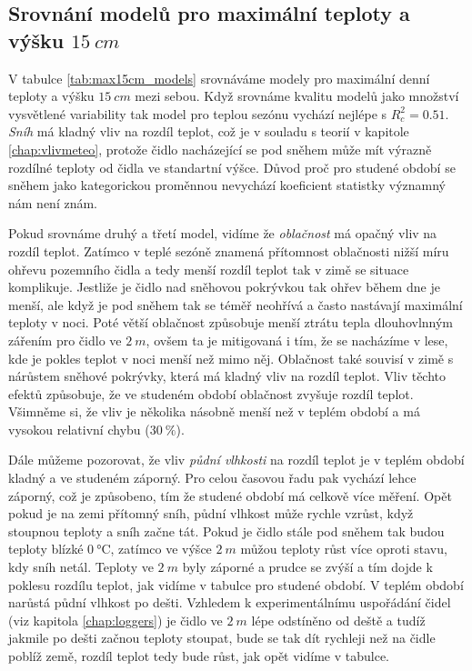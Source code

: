 \subsection{Srovnání modelů pro maximální teploty a výšku $\SI{15}{cm}$}
V tabulce \ref{tab:max15cm_models} srovnáváme modely pro maximální denní teploty a výšku $\SI{15}{cm}$ mezi sebou. Když srovnáme kvalitu modelů jako množství vysvětlené variability tak model pro teplou sezónu vychází nejlépe s $R_c^2 = 0.51$. \textit{Sníh} má kladný vliv na rozdíl teplot, což je v souladu s teorií v kapitole \ref{chap:vlivmeteo}, protože čidlo nacházející se pod sněhem může mít výrazně rozdílné teploty od čidla ve standartní výšce. Důvod proč pro studené období se sněhem jako kategorickou proměnnou nevychází koeficient statistky významný nám není znám.

Pokud srovnáme druhý a třetí model, vidíme že \textit{oblačnost} má opačný vliv na rozdíl teplot. Zatímco v teplé sezóně znamená přítomnost oblačnosti nižší míru ohřevu pozemního čidla a tedy menší rozdíl teplot tak v zimě se situace komplikuje. Jestliže je čidlo nad sněhovou pokrývkou tak ohřev během dne je menší, ale když je pod sněhem tak se téměř neohřívá a často nastávají maximální teploty v noci. Poté větší oblačnost způsobuje menší ztrátu tepla dlouhovlnným zářením pro čidlo ve $\SI{2}{m}$, ovšem ta je mitigovaná i tím, že se nacházíme v lese, kde je pokles teplot v noci menší než mimo něj. Oblačnost také souvisí v zimě s nárůstem sněhové pokrývky, která má kladný vliv na rozdíl teplot. Vliv těchto efektů způsobuje, že ve studeném období oblačnost zvyšuje rozdíl teplot. Všimněme si, že vliv je několika násobně menší než v teplém období a má vysokou relativní chybu ($\SI{30}{\%}$).

Dále můžeme pozorovat, že vliv \textit{půdní vlhkosti} na rozdíl teplot je v teplém období kladný a ve studeném záporný. Pro celou časovou řadu pak vychází lehce záporný, což je způsobeno, tím že studené období má celkově více měření. Opět pokud je na zemi přítomný sníh, půdní vlhkost může rychle vzrůst, když stoupnou teploty a sníh začne tát. Pokud je čidlo stále pod sněhem tak budou teploty blízké $\SI{0}{\celsius}$, zatímco ve výšce $\SI{2}{m}$ můžou teploty růst více oproti stavu, kdy sníh netál. Teploty ve $\SI{2}{m}$ byly záporné a prudce se zvýší a tím dojde k poklesu rozdílu teplot, jak vidíme v tabulce pro studené období. V teplém období narůstá půdní vlhkost po dešti. Vzhledem k experimentálnímu uspořádání čidel (viz kapitola \ref{chap:loggers}) je čidlo ve $\SI{2}{m}$ lépe odstíněno od deště a tudíž jakmile po dešti začnou teploty stoupat, bude se tak dít rychleji než na čidle poblíž země, rozdíl teplot tedy bude růst, jak opět vidíme v tabulce.

